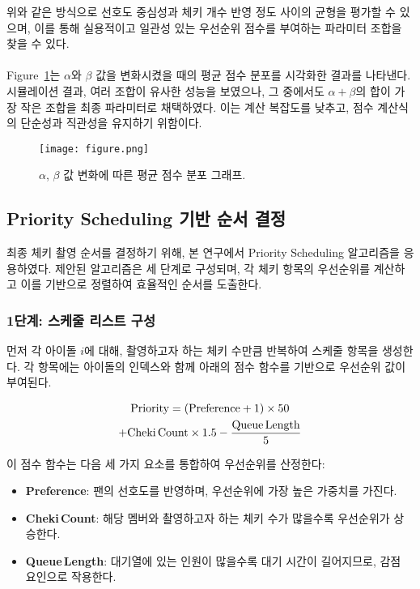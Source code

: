 \documentclass[12pt,hidelinks]{article}
\begin{document}
\noindent 위와 같은 방식으로 선호도 중심성과 체키 개수 반영 정도 사이의 균형을 평가할 수 있으며, 이를 통해 실용적이고 일관성 있는 우선순위 점수를 부여하는 파라미터 조합을 찾을 수 있다.
\\
\\
Figure~\ref{fig:alpha_beta_score}는 $\alpha$와 $\beta$ 값을 변화시켰을 때의 평균 점수 분포를 시각화한 결과를 나타낸다. 시뮬레이션 결과, 여러 조합이 유사한 성능을 보였으나, 그 중에서도 $\alpha + \beta$의 합이 가장 작은 조합을 최종 파라미터로 채택하였다. 이는 계산 복잡도를 낮추고, 점수 계산식의 단순성과 직관성을 유지하기 위함이다.

\begin{figure}[h]
	\centering
	\texttt{[image: figure.png]}
	\caption{$\alpha$, $\beta$ 값 변화에 따른 평균 점수 분포 그래프.}
	\label{fig:alpha_beta_score}
\end{figure}

\subsection{Priority Scheduling 기반 순서 결정}
최종 체키 촬영 순서를 결정하기 위해, 본 연구에서 Priority Scheduling 알고리즘을 응용하였다. 제안된 알고리즘은 세 단계로 구성되며, 각 체키 항목의 우선순위를 계산하고 이를 기반으로 정렬하여 효율적인 순서를 도출한다.

\subsubsection{1단계: 스케줄 리스트 구성}
먼저 각 아이돌 $i$에 대해, 촬영하고자 하는 체키 수만큼 반복하여 스케줄 항목을 생성한다. 각 항목에는 아이돌의 인덱스와 함께 아래의 점수 함수를 기반으로 우선순위 값이 부여된다.

\begin{multline*}
\displaystyle \text{Priority} = (\text{Preference} + 1) \times 50 \\
+ \text{Cheki\,Count} \times 1.5 - \frac{\text{Queue\,Length}}{5}
\end{multline*}

\noindent 이 점수 함수는 다음 세 가지 요소를 통합하여 우선순위를 산정한다:

\begin{itemize}
	\item \textbf{Preference}: 팬의 선호도를 반영하며, 우선순위에 가장 높은 가중치를 가진다.
	\item \textbf{Cheki\,Count}: 해당 멤버와 촬영하고자 하는 체키 수가 많을수록 우선순위가 상승한다.
	\item \textbf{Queue\,Length}: 대기열에 있는 인원이 많을수록 대기 시간이 길어지므로, 감점 요인으로 작용한다.
\end{itemize}
\end{document}
